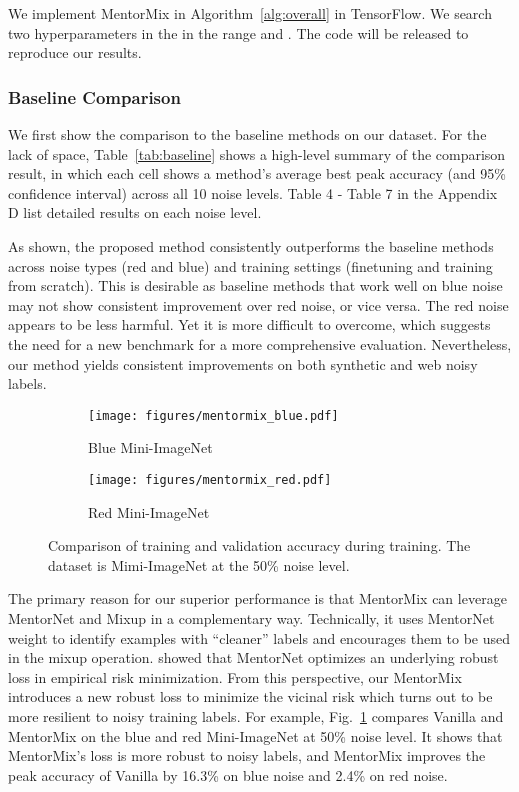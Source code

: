 \documentclass{article}
\begin{document}
We implement MentorMix in Algorithm~\ref{alg:overall} in TensorFlow. We search two hyperparameters  in the  in the range  and . The code will be released to reproduce our results.

\subsubsection{Baseline Comparison}
We first show the comparison to the baseline methods on our dataset. For the lack of space, Table~\ref{tab:baseline} shows a high-level summary of the comparison result, in which each cell shows a method's average best peak accuracy (and 95\% confidence interval) across all 10 noise levels. Table 4 - Table 7 in the Appendix D list detailed results on each noise level.

As shown, the proposed method consistently outperforms the baseline methods across noise types (red and blue) and training settings (finetuning and training from scratch). This is desirable as baseline methods that work well on blue noise may not show consistent improvement over red noise, or vice versa. The red noise appears to be less harmful. Yet it is more difficult to overcome, which suggests the need for a new benchmark for a more comprehensive evaluation. Nevertheless, our method yields consistent improvements on both synthetic and web noisy labels. 

\begin{figure}[ht]
\vspace{-2mm}
\centering
\begin{subfigure}[b]{0.23\textwidth}
    \texttt{[image: figures/mentormix\_blue.pdf]}
    \vspace{-5mm}
    \caption{Blue Mini-ImageNet}
\end{subfigure}
\begin{subfigure}[b]{0.23\textwidth}
    \texttt{[image: figures/mentormix\_red.pdf]}
    \vspace{-5mm}
    \caption{Red Mini-ImageNet}
\end{subfigure}
\vspace{-2mm}
\caption{\label{fig:mentormix_training}Comparison of training and validation accuracy during training. The dataset is Mimi-ImageNet at the 50\% noise level.}
\vspace{-3mm}
\end{figure}

The primary reason for our superior performance is that MentorMix can leverage MentorNet and Mixup in a complementary way. Technically, it uses MentorNet weight to identify examples with ``cleaner'' labels and encourages them to be used in the mixup operation. \cite{jiang2018mentornet} showed that MentorNet optimizes an underlying robust loss in empirical risk minimization. From this perspective, our MentorMix introduces a new robust loss to minimize the vicinal risk which turns out to be more resilient to noisy training labels. For example, Fig.~\ref{fig:mentormix_training} compares Vanilla and MentorMix on the blue and red Mini-ImageNet at 50\% noise level. It shows that MentorMix's loss is more robust to noisy labels, and MentorMix improves the peak accuracy of Vanilla by 16.3\% on blue noise and 2.4\% on red noise. 
\end{document}
